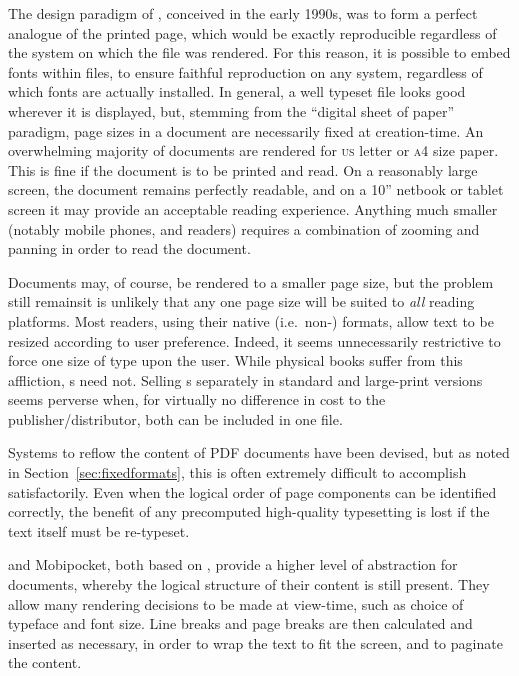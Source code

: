 The design paradigm of \pdf{}, conceived in the early 1990s,\hspace{0pt}\cite{Warnock1991} was to form a perfect analogue of the printed page, which would be exactly reproducible regardless of the system on which the file was rendered. For this reason, it is possible to embed fonts within \pdf{} files, to ensure faithful reproduction on any system, regardless of which fonts are actually installed. In general, a well typeset \pdf{} file looks good wherever it is displayed, but, stemming from the ``digital sheet of paper'' paradigm, page sizes in a \pdf{} document are necessarily fixed at creation-time. An overwhelming majority of \pdf{} documents are rendered for  \textsc{us} letter or \textsc{a}4 size paper. This is fine if the document is to be printed and read. On a reasonably large screen, the document remains perfectly readable, and on a 10'' netbook or tablet screen it may provide an acceptable reading experience. Anything much smaller (notably mobile phones, and \ebook{} readers) requires a combination of zooming and panning  in order to read the document.

Documents may, of course, be rendered to a smaller page size, but the problem still remains\ed it is unlikely that any one page size will be suited to \emph{all} reading platforms. Most \ebook{} readers, using their native (i.e.\ non-\pdf{}) formats, allow text to be resized according to user preference. Indeed, it seems unnecessarily restrictive to force one size of type upon the user. While physical books suffer from this affliction, \ebook{}s need not. Selling \ebook{}s separately in standard and large-print versions seems perverse when, for virtually no difference in cost to the publisher/distributor, both can be included in one file.

Systems to reflow the content of PDF documents have been devised,\hspace{0pt}\cite{Lovegrove1995,Marinai2013} but as noted in Section~\ref{sec:fixedformats}, this is often extremely difficult to accomplish satisfactorily. Even when the logical order of page components can be identified correctly, the benefit of any precomputed high-quality typesetting is lost if the text itself must be re-typeset.

\epub{} and Mobipocket, both based on \html{}, provide a higher level of abstraction for documents, whereby the logical structure of their content is still present. They allow many rendering decisions to be made at view-time, such as choice of typeface and font size. Line breaks and page breaks are then calculated and inserted as necessary, in order to wrap the text to fit the screen, and to paginate the content.

